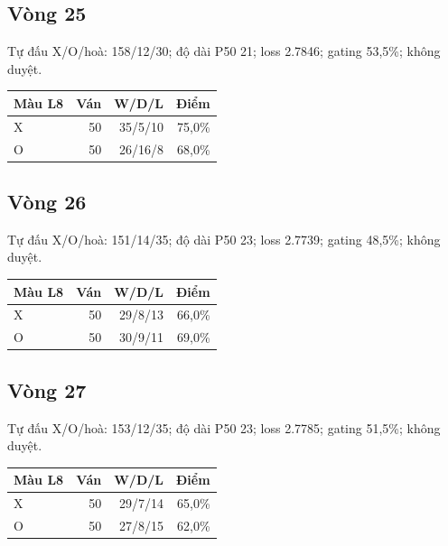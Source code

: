 \subsection*{Vòng 25}

Tự đấu X/O/hoà: 158/12/30; độ dài P50 21; loss 2.7846; gating 53,5\%; không duyệt.

\begin{center}\scriptsize\begin{tabular}{@{}lrrr@{}}\toprule

Màu L8 & Ván & W/D/L & Điểm \\

\midrule

X & 50 & 35/5/10 & 75,0\% \\

O & 50 & 26/16/8 & 68,0\% \\

\bottomrule\end{tabular}\end{center}

\subsection*{Vòng 26}

Tự đấu X/O/hoà: 151/14/35; độ dài P50 23; loss 2.7739; gating 48,5\%; không duyệt.

\begin{center}\scriptsize\begin{tabular}{@{}lrrr@{}}\toprule

Màu L8 & Ván & W/D/L & Điểm \\

\midrule

X & 50 & 29/8/13 & 66,0\% \\

O & 50 & 30/9/11 & 69,0\% \\

\bottomrule\end{tabular}\end{center}

\subsection*{Vòng 27}

Tự đấu X/O/hoà: 153/12/35; độ dài P50 23; loss 2.7785; gating 51,5\%; không duyệt.

\begin{center}\scriptsize\begin{tabular}{@{}lrrr@{}}\toprule

Màu L8 & Ván & W/D/L & Điểm \\

\midrule

X & 50 & 29/7/14 & 65,0\% \\

O & 50 & 27/8/15 & 62,0\% \\

\bottomrule\end{tabular}\end{center}

